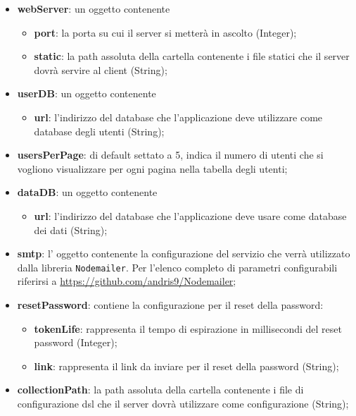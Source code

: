 \begin{itemize}
\item \textbf{webServer}: un oggetto contenente
		\begin{itemize}
		\item \textbf{port}: la porta su cui il server si metterà in ascolto (Integer);
		\item \textbf{static}: la path assoluta della cartella contenente i file statici che il server dovrà servire al client (String);
		\end{itemize}
		
\item \textbf{userDB}: un oggetto contenente
		\begin{itemize}
		\item \textbf{url}: l'indirizzo del database che l'applicazione deve utilizzare come database degli utenti (String);
		\end{itemize}

\item \textbf{usersPerPage}: di default settato a 5, indica il numero di utenti che si vogliono visualizzare per ogni pagina nella tabella degli utenti;
		
\item \textbf{dataDB}: un oggetto contenente
		\begin{itemize}
		\item \textbf{url}: l'indirizzo del database che l'applicazione deve usare come database dei dati (String);
		\end{itemize}

\item \textbf{smtp}: l' oggetto contenente la configurazione del servizio  che verrà utilizzato dalla libreria \texttt{Nodemailer}. Per l'elenco completo di parametri configurabili riferirsi a \url{https://github.com/andris9/Nodemailer};
		
\item \textbf{resetPassword}: contiene la configurazione per il reset della password:
	\begin{itemize}
		\item \textbf{tokenLife}: rappresenta il tempo di espirazione in millisecondi del reset password (Integer);
		\item \textbf{link}: rappresenta il link da inviare per il reset della password (String);
	\end{itemize}

\item \textbf{collectionPath}: la path assoluta della cartella contenente i file di configurazione dsl che il server dovrà utilizzare come configurazione (String);
		

\end{itemize}
